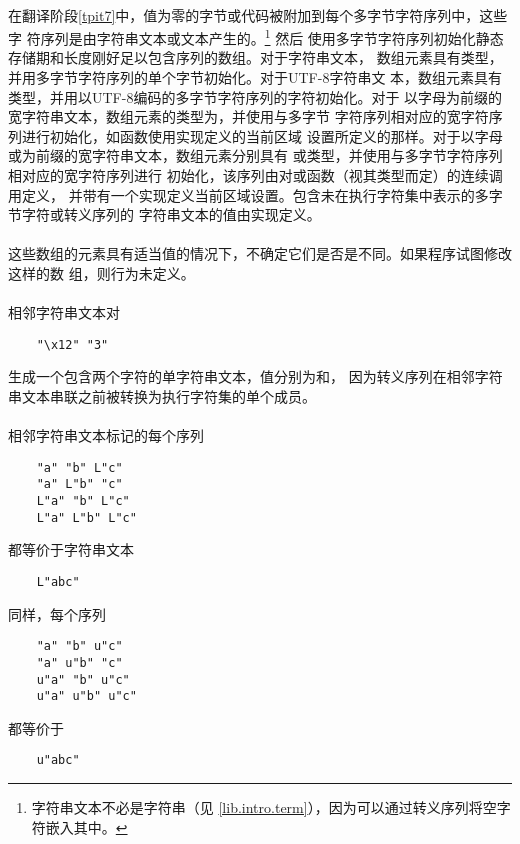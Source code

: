 \paragraph{}
在翻译阶段\ref{tpit7}中，值为零的字节或代码被附加到每个多字节字符序列中，这些字
符序列是由字符串文本或文本产生的。\footnote{字符串文本不必是字符串（见
\ref{lib.intro.term}），因为可以通过转义序列将空字符嵌入其中。}  然后
使用多字节字符序列初始化静态存储期和长度刚好足以包含序列的数组。对于字符串文本，
数组元素具有类型，并用多字节字符序列的单个字节初始化。对于UTF-8字符串文
本，数组元素具有类型，并用以UTF-8编码的多字节字符序列的字符初始化。对于
以字母为前缀的宽字符串文本，数组元素的类型为，并使用与多字节
字符序列相对应的宽字符序列进行初始化，如函数使用实现定义的当前区域
设置所定义的那样。对于以字母或为前缀的宽字符串文本，数组元素分别具有
或类型，并使用与多字节字符序列相对应的宽字符序列进行
初始化，该序列由对或函数（视其类型而定）的连续调用定义，
并带有一个实现定义当前区域设置。包含未在执行字符集中表示的多字节字符或转义序列的
字符串文本的值由实现定义。

\paragraph{}
这些数组的元素具有适当值的情况下，不确定它们是否是不同。如果程序试图修改这样的数
组，则行为未定义。

\paragraph{}
\ex 相邻字符串文本对
\begin{lstlisting}
    "\x12" "3"
\end{lstlisting}
生成一个包含两个字符的单字符串文本，值分别为和\tm{\sq 3\sq}，
因为转义序列在相邻字符串文本串联之前被转换为执行字符集的单个成员。

\paragraph{}
\ex 相邻字符串文本标记的每个序列
\begin{lstlisting}
    "a" "b" L"c"
    "a" L"b" "c"
    L"a" "b" L"c"
    L"a" L"b" L"c"
\end{lstlisting}
都等价于字符串文本
\begin{lstlisting}
    L"abc"
\end{lstlisting}
同样，每个序列
\begin{lstlisting}
    "a" "b" u"c"
    "a" u"b" "c"
    u"a" "b" u"c"
    u"a" u"b" u"c"
\end{lstlisting}
都等价于
\begin{lstlisting}
    u"abc"
\end{lstlisting}

